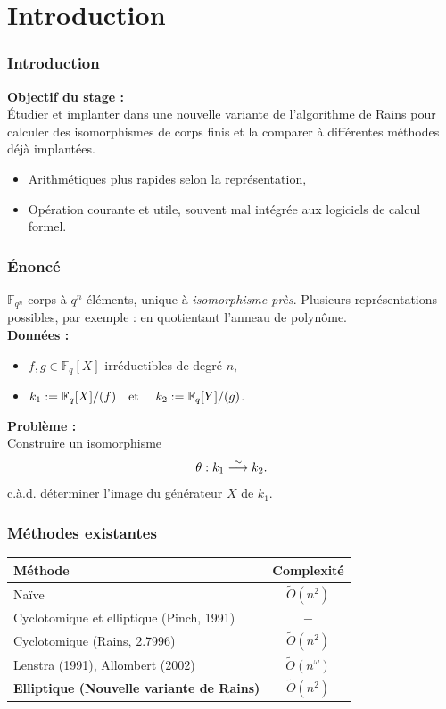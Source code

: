\documentclass{beamer} %
\numberwithin{equation}{section}
\newcommand\GF[1]{\mathbb{F}_{#1}}
\newcommand\etmath{\textup{\quad et \quad}}
\newcommand\tO[1]{\widetilde{O}(#1)}
\begin{document}
\section{Introduction}
\begin{frame}
\frametitle{Introduction}
\textbf{Objectif du stage :}\\
Étudier et implanter dans  une nouvelle variante de l'algorithme de
Rains pour calculer des isomorphismes de corps finis et la comparer à
différentes méthodes déjà implantées.
\vspace{0.3cm}
\begin{itemize}
	\item Arithmétiques plus rapides selon la représentation,
	\item Opération courante et utile, souvent mal intégrée aux logiciels de
calcul formel.
\end{itemize}
		

\end{frame}
\begin{frame}
\frametitle{Énoncé}
$\GF{q^n}$ \fg{} corps à $q^n$ éléments, unique à \emph{isomorphisme
près}. Plusieurs représentations possibles, par exemple : en quotientant 
l'anneau de polynôme.\\
\textbf{Données :}
\begin{itemize}
\item $f,g\in\GF{q}[X]$ irréductibles de degré $n$,
\item $k_1 := \GF{q}[X]/(f)\etmath k_2 := \GF{q}[Y]/(g)$.
\end{itemize}
\textbf{Problème :}\\
Construire un isomorphisme
\[\theta : k_1 \buildrel\sim\over\longrightarrow k_2.\]
c.à.d. déterminer l'image du générateur $X$ de $k_1$.

\end{frame}
\begin{frame}
\frametitle{Méthodes existantes}
\begin{table}
\centering
\begin{tabular}{|l|c|}
	\hline
	Méthode & Complexité\\
	\hline\hline
	Naïve  & \rule{0pt}{2.7ex} $\tO{n^2}$\\
	\hline
	Cyclotomique et elliptique (Pinch, 1991) & \rule{0pt}{2.7ex}$-$\\
	\hline
	Cyclotomique (Rains, 2.7996) & \rule{0pt}{2.7ex} $\tO{n^2}$\\
	\hline
	Lenstra (1991), Allombert (2002) & \rule{0pt}{2.7ex} $\tO{n^{\omega}}$\\
	\hline
	\textbf{Elliptique (Nouvelle variante de Rains)} & \rule{0pt}{2.7ex} 
$\tO{n^2}$\\
	\hline
\end{tabular}
\end{table}
\end{frame}
\end{document}
